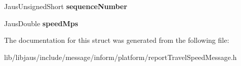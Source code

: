 \begin{DoxyCompactItemize}
\item 
\hypertarget{struct_report_travel_speed_message_struct_a880282006c3ff7fe2b7d7171530c8cb5}{\-Jaus\-Unsigned\-Short {\bfseries sequence\-Number}}\label{struct_report_travel_speed_message_struct_a880282006c3ff7fe2b7d7171530c8cb5}

\item 
\hypertarget{struct_report_travel_speed_message_struct_abd9b9588746e762c50ee08585f368b78}{\-Jaus\-Double {\bfseries speed\-Mps}}\label{struct_report_travel_speed_message_struct_abd9b9588746e762c50ee08585f368b78}

\end{DoxyCompactItemize}


\-The documentation for this struct was generated from the following file\-:\begin{DoxyCompactItemize}
\item 
lib/libjaus/include/message/inform/platform/report\-Travel\-Speed\-Message.\-h\end{DoxyCompactItemize}

